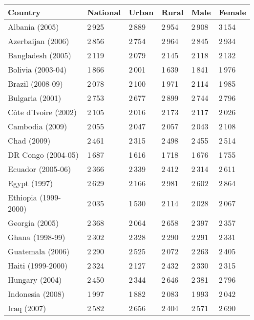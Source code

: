 \renewcommand{\arraystretch}{1.3}
\footnotesize
{} \label{tab:title} 
      \begin{tabular}{L{2.0cm} R{0.7cm} R{0.7cm} R{0.7cm} R{0.7cm} R{0.7cm}}
      \toprule
      Country & National & Urban & Rural & Male & Female \\
      \midrule
        Albania (2005) & 2\,925 & 2\,889 & 2\,954 & 2\,908 & 3\,154 \\
        Azerbaijan (2006) & 2\,856 & 2\,754 & 2\,964 & 2\,845 & 2\,934 \\
        Bangladesh (2005) & 2\,119 & 2\,079 & 2\,145 & 2\,118 & 2\,132 \\
        Bolivia (2003-04) & 1\,866 & 2\,001 & 1\,639 & 1\,841 & 1\,976 \\
        Brazil (2008-09) & 2\,078 & 2\,100 & 1\,971 & 2\,114 & 1\,985 \\
        Bulgaria (2001) & 2\,753 & 2\,677 & 2\,899 & 2\,744 & 2\,796 \\
        C\^{o}te d'Ivoire (2002) & 2\,105 & 2\,016 & 2\,173 & 2\,117 & 2\,026 \\
        Cambodia (2009) & 2\,055 & 2\,047 & 2\,057 & 2\,043 & 2\,108 \\
        Chad (2009) & 2\,461 & 2\,315 & 2\,498 & 2\,455 & 2\,514 \\
        DR Congo (2004-05) & 1\,687 & 1\,616 & 1\,718 & 1\,676 & 1\,755 \\
        Ecuador (2005-06) & 2\,366 & 2\,339 & 2\,412 & 2\,314 & 2\,611 \\
        Egypt (1997) & 2\,629 & 2\,166 & 2\,981 & 2\,602 & 2\,864 \\
        Ethiopia (1999-2000) & 2\,035 & 1\,530 & 2\,114 & 2\,028 & 2\,067 \\
        Georgia (2005) & 2\,368 & 2\,064 & 2\,658 & 2\,397 & 2\,357 \\
        Ghana (1998-99) & 2\,302 & 2\,328 & 2\,290 & 2\,291 & 2\,331 \\
        Guatemala (2006) & 2\,290 & 2\,525 & 2\,072 & 2\,263 & 2\,405 \\
        Haiti (1999-2000) & 2\,324 & 2\,127 & 2\,432 & 2\,330 & 2\,315 \\
        Hungary (2004) & 2\,450 & 2\,344 & 2\,646 & 2\,381 & 2\,796 \\
        Indonesia (2008) & 1\,997 & 1\,882 & 2\,083 & 1\,993 & 2\,042 \\
        Iraq (2007) & 2\,582 & 2\,656 & 2\,404 & 2\,571 & 2\,690 \\

\end{tabular}
